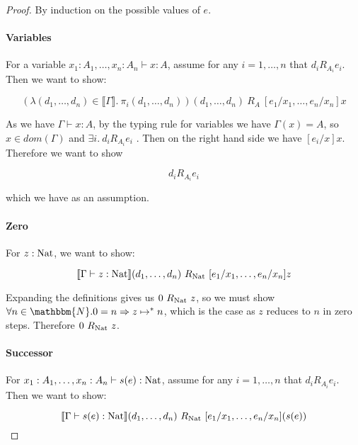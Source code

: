 \begin{proof}
By induction on the possible values of $e$.

\paragraph{Variables} For a variable $x_1 : A_1, \dots, x_n : A_n \vdash x : A$, assume for any $i = 1, \dots, n$ that $d_i R_{A_i} e_i$. Then we want to show:

\[ (\lambda (d_1, \dots, d_n) \in \llbracket \Gamma \rrbracket. \ \pi_i(d_1, \dots, d_n))(d_1, \dots, d_n) \ R_A \ [e_1/x_1, \dots, e_n/x_n]x \]

As we have $\Gamma \vdash x : A$, by the typing rule for variables we have $\Gamma(x) = A$, so $x \in dom(\Gamma)$ and $\exists i. \ d_i R_{A_i} e_i$ . Then on the right hand side we have $[e_i/x]x$. Therefore we want to show

\[ d_i R_{A_i} e_i \]

which we have as an assumption. 



\paragraph{Zero} For $z : \operatorname{Nat}$, we want to show:

\[ \llbracket \Gamma \vdash z : \operatorname{Nat} \rrbracket (d_1, \dots, d_n) \ R_{\operatorname{Nat}} \ [e_1/x_1, \dots, e_n/x_n]z \]

Expanding the definitions gives us $0 \ R_{\nat} \ z$, so we must show $\forall n \in \mathbbm{N}. 0 = n \Rightarrow z \mapsto^* n$, which is the case as $z$ reduces to $n$ in zero steps. Therefore $0 \ R_{\nat} \ z$.

\paragraph{Successor} For $x_1 : A_1, \dots, x_n : A_n \vdash s(e) : \operatorname{Nat}$, assume for any $i = 1, \dots, n$ that $d_i R_{A_i} e_i$. Then we want to show:

\[ \llbracket \Gamma \vdash s(e) : \operatorname{Nat} \rrbracket (d_1, \dots, d_n) \ R_{\operatorname{Nat}} \ [e_1/x_1, \dots, e_n/x_n](s(e))\]


\end{proof}

